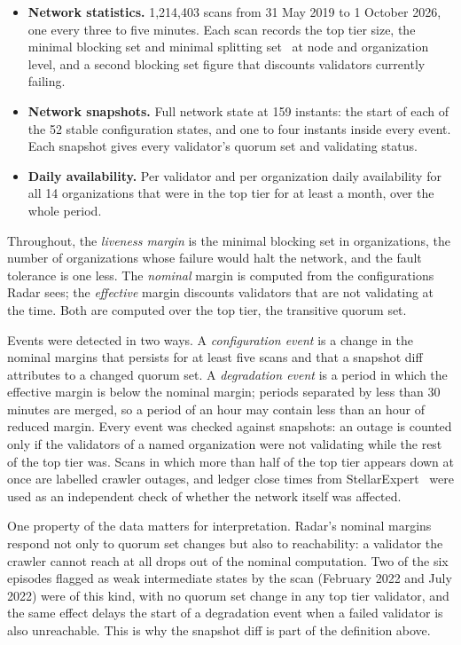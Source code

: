 \documentclass[11pt,a4paper]{article}
\begin{document}
\begin{itemize}
\item \textbf{Network statistics.} 1,214,403 scans from 31 May 2019 to 1 October 2026, one every three to five minutes. Each scan records the top tier size, the minimal blocking set and minimal splitting set~\cite{florian2022} at node and organization level, and a second blocking set figure that discounts validators currently failing.
\item \textbf{Network snapshots.} Full network state at 159 instants: the start of each of the 52 stable configuration states, and one to four instants inside every event. Each snapshot gives every validator's quorum set and validating status.
\item \textbf{Daily availability.} Per validator and per organization daily availability for all 14 organizations that were in the top tier for at least a month, over the whole period.
\end{itemize}

Throughout, the \emph{liveness margin} is the minimal blocking set in organizations, the number of organizations whose failure would halt the network, and the fault tolerance is one less. The \emph{nominal} margin is computed from the configurations Radar sees; the \emph{effective} margin discounts validators that are not validating at the time. Both are computed over the top tier, the transitive quorum set.

Events were detected in two ways. A \emph{configuration event} is a change in the nominal margins that persists for at least five scans and that a snapshot diff attributes to a changed quorum set. A \emph{degradation event} is a period in which the effective margin is below the nominal margin; periods separated by less than 30 minutes are merged, so a period of an hour may contain less than an hour of reduced margin. Every event was checked against snapshots: an outage is counted only if the validators of a named organization were not validating while the rest of the top tier was. Scans in which more than half of the top tier appears down at once are labelled crawler outages, and ledger close times from StellarExpert~\cite{stellarexpert} were used as an independent check of whether the network itself was affected.

One property of the data matters for interpretation. Radar's nominal margins respond not only to quorum set changes but also to reachability: a validator the crawler cannot reach at all drops out of the nominal computation. Two of the six episodes flagged as weak intermediate states by the scan (February 2022 and July 2022) were of this kind, with no quorum set change in any top tier validator, and the same effect delays the start of a degradation event when a failed validator is also unreachable. This is why the snapshot diff is part of the definition above.
\end{document}
